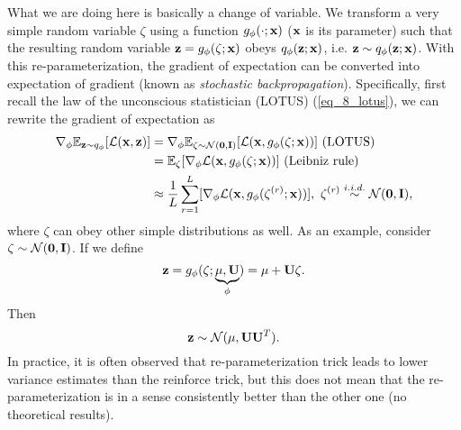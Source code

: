 \documentclass[../book-template.tex]{subfiles}
\begin{document}
What we are doing here is basically a change of variable. We transform a very simple random variable $\zeta$ using a function $g_\phi(\cdot;{\bf x})$ (${\bf x}$ is its parameter) such that the resulting random variable ${\bf z}=g_\phi(\zeta;{\bf x})$ obeys $q_\phi({\bf z};{\bf x})$, i.e. ${\bf z}\sim q_\phi({\bf z};{\bf x})$. With this re-parameterization, the gradient of expectation can be converted into expectation of gradient (known as \emph{stochastic backpropagation}). Specifically, first recall the law of the unconscious statistician (LOTUS) (\ref{eq_8_lotus}), we can rewrite the gradient of expectation as
\begin{align*}
	\nabla_\phi \mathbb{E}_{{\bf z}\sim q_\phi}[\mathcal{L}({\bf x,z})] &= \nabla_\phi \mathbb{E}_{\zeta\sim\mathcal{N}({\bf 0,I})} [\mathcal{L}({\bf x},g_\phi(\zeta;{\bf x}))]\ ({\rm LOTUS})\\
	&=\mathbb{E}_{\zeta}[\nabla_\phi \mathcal{L}({\bf x},g_\phi(\zeta;{\bf x}))]\ (\text{Leibniz rule})\\
	&\approx \frac{1}{L}\sum_{r=1}^{L}[\nabla_\phi \mathcal{L}({\bf x},g_\phi(\zeta^{(r)};{\bf x}))],\ \zeta^{(r)}\overset{i.i.d.}{\sim}\mathcal{N}({\bf 0,I}),
\end{align*}
where $\zeta$ can obey other simple distributions as well. As an example, consider $\zeta\sim\mathcal{N}({\bf 0,I})$. If we define
\begin{equation*}
	{\bf z} = g_\phi(\zeta;\underbrace{\mu,{\bf U}}_{\phi})=\mu +{\bf U}\zeta.
\end{equation*}
Then
\begin{equation*}
	{\bf z}\sim \mathcal{N}(\mu,{\bf UU}^T).
\end{equation*}
In practice, it is often observed that re-parameterization trick leads to lower variance estimates than the reinforce trick, but this does not mean that the re-parameterization is in a sense consistently better than the other one (no theoretical results).
\end{document}
